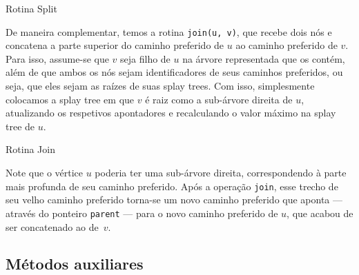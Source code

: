 \begin{algorithm}[h!]
    \caption{Rotina Split}\label{splay:split}
    \begin{algorithmic}[1]
        \EndIf
        \EndFunction
    \end{algorithmic}
\end{algorithm}

De maneira complementar, temos a rotina \texttt{join(u, v)}, que recebe dois nós e concatena a parte superior do caminho preferido de $u$ ao caminho preferido de $v$. Para isso, assume-se que $v$ seja filho de $u$ na árvore representada que os contém, além de que ambos os nós sejam identificadores de seus caminhos preferidos, ou seja, que eles sejam as raízes de suas splay trees. Com isso, simplesmente colocamos a splay tree em que $v$ é raiz como a sub-árvore direita de $u$, atualizando os respetivos apontadores e recalculando o valor máximo na splay tree de $u$.

\begin{algorithm}[h!]
    \caption{Rotina Join}\label{splay:join}
    \begin{algorithmic}[1]
        \EndIf
        \State {}
        \EndFunction
    \end{algorithmic}
\end{algorithm}

Note que o vértice $u$ poderia ter uma sub-árvore direita, correspondendo à parte mais profunda de seu caminho preferido. Após a operação \texttt{join}, esse trecho de seu velho caminho preferido torna-se um novo caminho preferido que aponta --- através do ponteiro \texttt{parent} --- para o novo caminho preferido de $u$, que acabou de ser concatenado ao de~$v$.

\subsection{Métodos auxiliares}
\label{subsection:lct-splay-aux}

